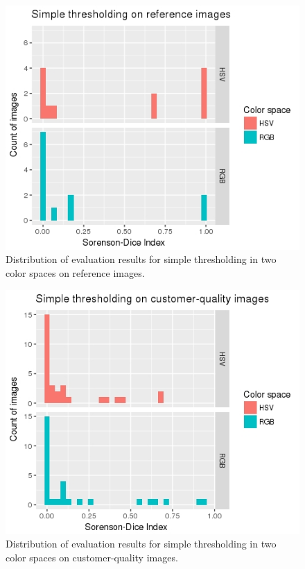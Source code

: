 \documentclass{article}
\begin{document}
\begin{figure}
    \includegraphics[width=\linewidth]{images/simple_ref.jpeg}
    \caption{Distribution of evaluation results for simple thresholding in two color spaces on reference images.}
    \label{fig:simple-ref}
\end{figure}

\begin{figure}
    \includegraphics[width=\linewidth]{images/simple_cust.jpeg}
    \caption{Distribution of evaluation results for simple thresholding in two color spaces on customer-quality images.}
    \label{fig:simple-cust}
\end{figure}
\end{document}
